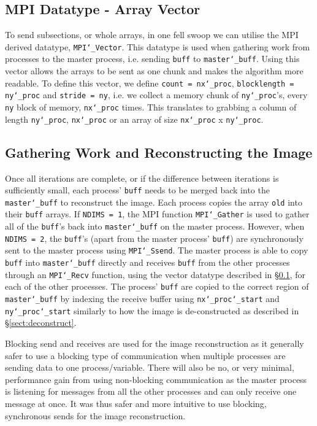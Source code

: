 \documentclass[11pt, a4paper]{article}
\begin{document}
		\subsection{MPI Datatype - Array Vector} \label{sect:array_vector}
			To send subsections, or whole arrays, in one fell swoop we can utilise the MPI derived datatype, \texttt{MPI\char`_Vector}. This datatype is used when gathering work from processes to the master process, i.e. sending \texttt{buff} to \texttt{master\char`_buff}. Using this vector allows the arrays to be sent as one chunk and makes the algorithm more readable. To define this vector, we define \texttt{count = nx\char`_proc}, \texttt{blocklength = ny\char`_proc} and \texttt{stride = ny}, i.e. we collect a memory chunk of \texttt{ny\char`_proc}'s, every \texttt{ny} block of memory, \texttt{nx\char`_proc} times. This translates to grabbing a column of length \texttt{ny\char`_proc}, \texttt{nx\char`_proc} or an array of size \texttt{nx\char`_proc} x \texttt{ny\char`_proc}.	
		
		\subsection{Gathering Work and Reconstructing the Image} \label{sect:reconstruct}
			Once all iterations are complete, or if the difference between iterations is sufficiently small, each process' \texttt{buff} needs to be merged back into the \texttt{master\char`_buff} to reconstruct the image. Each process copies the array \texttt{old} into their \texttt{buff} arrays. If \texttt{NDIMS = 1}, the MPI function \texttt{MPI\char`_Gather} is used to gather all of the \texttt{buff}'s back into \texttt{master\char`_buff} on the master process. However, when \texttt{NDIMS = 2}, the \texttt{buff}'s (apart from the master process' \texttt{buff}) are synchronously sent to the master process using \texttt{MPI\char`_Ssend}. The master process is able to copy \texttt{buff} into \texttt{master\char`_buff} directly and receives \texttt{buff} from the other processes through an \texttt{MPI\char`_Recv} function, using the vector datatype described in \S\ref{sect:array_vector}, for each of the other processes. The process' \texttt{buff} are copied to the correct region of \texttt{master\char`_buff} by indexing the receive buffer using \texttt{nx\char`_proc\char`_start} and \texttt{ny\char`_proc\char`_start} similarly to how the image is de-constructed as described in \S\ref{sect:deconstruct}.
			
			Blocking send and receives are used for the image reconstruction as it generally safer to use a blocking type of communication when multiple processes are sending data to one process/variable. There will also be no, or very minimal, performance gain from using non-blocking communication as the master process is listening for messages from all the other processes and can only receive one message at once. It was thus safer and more intuitive to use blocking, synchronous sends for the image reconstruction.
\end{document}
